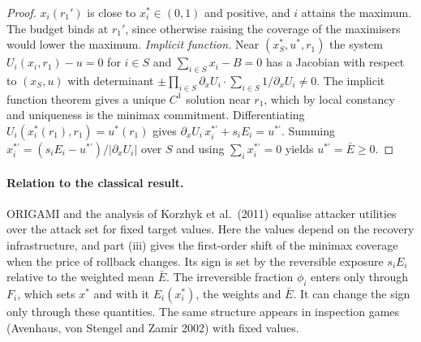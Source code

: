 \documentclass[11pt]{article}
\theoremstyle{definition}
\begin{document}
\begin{proof}
$x_i(r_1')$ is close to $x^*_i\in(0,1)$ and positive, and $i$ attains the maximum. The budget binds at
$r_1'$, since otherwise raising the coverage of the maximisers would lower the maximum. \emph{Implicit
function.} Near $(x^*_S,u^*,r_1)$ the system $U_i(x_i,r_1)-u=0$ for $i\in S$ and $\sum_{i\in S}x_i-B=0$ has a
Jacobian with respect to $(x_S,u)$ with determinant $\pm\prod_{i\in S}\partial_xU_i\cdot\sum_{i\in S}1/\partial_xU_i\neq0$.
The implicit function theorem gives a unique $C^1$ solution near $r_1$, which by local constancy and
uniqueness is the minimax commitment. Differentiating $U_i(x_i^*(r_1),r_1)=u^*(r_1)$ gives
$\partial_xU_i\,x_i^{*\prime}+s_iE_i=u^{*\prime}$. Summing $x_i^{*\prime}=(s_iE_i-u^{*\prime})/|\partial_xU_i|$
over $S$ and using $\sum_ix_i^{*\prime}=0$ yields $u^{*\prime}=\bar E\ge0$.
\end{proof}

\paragraph{Relation to the classical result.} ORIGAMI and the analysis of Korzhyk et al.\ (2011) equalise
attacker utilities over the attack set for fixed target values. Here the values depend on the recovery
infrastructure, and part (iii) gives the first-order shift of the minimax coverage when the price of rollback
changes. Its sign is set by the reversible exposure $s_iE_i$ relative to the weighted mean $\bar E$. The
irreversible fraction $\phi_i$ enters only through $F_i$, which sets $x^*$ and with it $E_i(x_i^*)$, the
weights and $\bar E$. It can change the sign only through these quantities. The same structure appears in
inspection games (Avenhaus, von Stengel and Zamir 2002) with fixed values.
\end{document}
